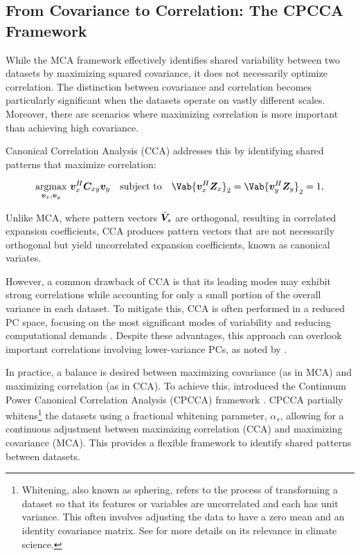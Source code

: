 \subsection{From Covariance to Correlation: The CPCCA Framework}\label{sec:theory:cpcca}
While the MCA framework effectively identifies shared variability between two datasets by maximizing squared covariance, it does not necessarily optimize correlation. The distinction between covariance and correlation becomes particularly significant when the datasets operate on vastly different scales. Moreover, there are scenarios where maximizing correlation is more important than achieving high covariance.

Canonical Correlation Analysis (CCA) \cite{hotelling_relations_1936} addresses this by identifying shared patterns that maximize correlation:

\begin{align}\label{eq:theory:cca_maximization}
    \argmax_{\bm{v}_{x}, \bm{v}_{y}} \, \bm{v}_{x}^H \bm{C}_{xy} \bm{v}_{y} \quad \text{subject to} \quad \Vab{\bm{v}_{x}^H \bm{Z}_x}_2 = \Vab{\bm{v}_{y}^H \bm{Z}_y}_2 = 1,
\end{align}

Unlike MCA, where pattern vectors $\tilde{\bm{V}}_{s}$ are orthogonal, resulting in correlated expansion coefficients, CCA produces pattern vectors that are not necessarily orthogonal but yield uncorrelated expansion coefficients, known as canonical variates.

However, a common drawback of CCA is that its leading modes may exhibit strong correlations while accounting for only a small portion of the overall variance in each dataset. To mitigate this, CCA is often performed in a reduced PC space, focusing on the most significant modes of variability and reducing computational demands \cite[][pp. 320-321]{storch_statistical_1999}. Despite these advantages, this approach can overlook important correlations involving lower-variance PCs, as noted by \citet[][p. 223]{jolliffe_principal_2002}.

In practice, a balance is desired between maximizing covariance (as in MCA) and maximizing correlation (as in CCA). To achieve this, \citet{swenson_continuum_2015} introduced the Continuum Power Canonical Correlation Analysis (CPCCA) framework \cite{swenson_continuum_2015}. CPCCA partially whitens\footnote{Whitening, also known as sphering, refers to the process of transforming a dataset so that its features or variables are uncorrelated and each has unit variance. This often involves adjusting the data to have a zero mean and an identity covariance matrix. See \citet{delsole_predictability_2007} for more details on its relevance in climate science.} the datasets using a fractional whitening parameter, $\alpha_s$, allowing for a continuous adjustment between maximizing correlation (CCA) and maximizing covariance (MCA). This provides a flexible framework to identify shared patterns between datasets.

